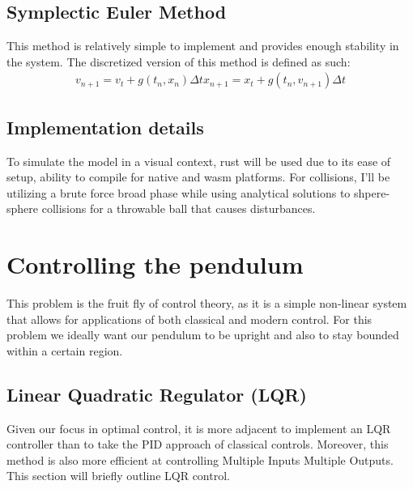 \documentclass{article}
\begin{document}
\subsection{Symplectic Euler Method}
This method is relatively simple to implement and provides enough stability
in the system. The discretized version of this method is defined as such:
\begin{align*}
	v_{n+1} = v_t + g(t_n,x_n) \Delta t
	x_{n+1} = x_t + g(t_n,v_{n+1}) \Delta t
\end{align*}

\subsection{Implementation details}
To simulate the model in a visual context, rust will be used due to its ease of
setup, ability to compile for native and wasm platforms. For collisions,
I'll be utilizing a brute force broad phase while using analytical solutions
to shpere-sphere collisions for a throwable ball that causes disturbances.

\section{Controlling the pendulum}
This problem is the fruit fly of control theory, as it is a simple
non-linear system that allows for applications of both classical
and modern control. For this problem we ideally want our pendulum to
be upright and also to stay bounded within a certain region.

\subsection{Linear Quadratic Regulator (LQR)}
Given our focus in optimal control, it is more adjacent to implement
an LQR controller than to take the PID approach of classical controls.
Moreover, this method is also more efficient at controlling Multiple
Inputs Multiple Outputs. This section will briefly outline LQR control.

\end{document}
